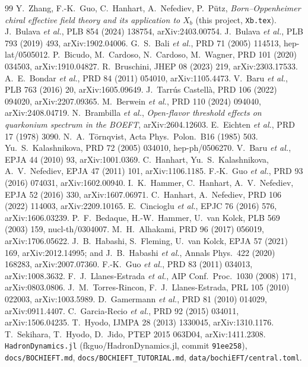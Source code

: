 \documentclass[11pt,a4paper]{article}
\begin{document}
\begin{thebibliography}{99}
\small
{} Y.~Zhang, F.-K.~Guo, C.~Hanhart, A.~Nefediev, P.~P\"utz, \emph{Born--Oppenheimer chiral effective field theory and its application to $X_b$} (this project, \texttt{Xb.tex}).
 J.~Bulava \emph{et al.}, PLB 854 (2024) 138754, arXiv:2403.00754.
 J.~Bulava \emph{et al.}, PLB 793 (2019) 493, arXiv:1902.04006.
 G.~S.~Bali \emph{et al.}, PRD 71 (2005) 114513, hep-lat/0505012.
 P.~Bicudo, M.~Cardoso, N.~Cardoso, M.~Wagner, PRD 101 (2020) 034503, arXiv:1910.04827.
 R.~Bruschini, JHEP 08 (2023) 219, arXiv:2303.17533.
 A.~E.~Bondar \emph{et al.}, PRD 84 (2011) 054010, arXiv:1105.4473.
 V.~Baru \emph{et al.}, PLB 763 (2016) 20, arXiv:1605.09649.
 J.~Tarr\'us Castell\`a, PRD 106 (2022) 094020, arXiv:2207.09365.
 M.~Berwein \emph{et al.}, PRD 110 (2024) 094040, arXiv:2408.04719.
 N.~Brambilla \emph{et al.}, \emph{Open-flavor threshold effects on quarkonium spectrum in the BOEFT}, arXiv:2604.12603.
 E.~Eichten \emph{et al.}, PRD 17 (1978) 3090.
 N.~A.~T\"ornqvist, Acta Phys.\ Polon.\ B16 (1985) 503.
 Yu.~S.~Kalashnikova, PRD 72 (2005) 034010, hep-ph/0506270.
 V.~Baru \emph{et al.}, EPJA 44 (2010) 93, arXiv:1001.0369.
 C.~Hanhart, Yu.~S.~Kalashnikova, A.~V.~Nefediev, EPJA 47 (2011) 101, arXiv:1106.1185.
 F.-K.~Guo \emph{et al.}, PRD 93 (2016) 074031, arXiv:1602.00940.
 I.~K.~Hammer, C.~Hanhart, A.~V.~Nefediev, EPJA 52 (2016) 330, arXiv:1607.06971.
 C.~Hanhart, A.~Nefediev, PRD 106 (2022) 114003, arXiv:2209.10165.
 E.~Cincioglu \emph{et al.}, EPJC 76 (2016) 576, arXiv:1606.03239.
 P.~F.~Bedaque, H.-W.~Hammer, U.~van Kolck, PLB 569 (2003) 159, nucl-th/0304007.
 M.~H.~Alhakami, PRD 96 (2017) 056019, arXiv:1706.05622.
 J.~B.~Habashi, S.~Fleming, U.~van Kolck, EPJA 57 (2021) 169, arXiv:2012.14995; and J.~B.~Habashi \emph{et al.}, Annals Phys.\ 422 (2020) 168283, arXiv:2007.07360.
 F.-K.~Guo \emph{et al.}, PRD 83 (2011) 034013, arXiv:1008.3632.
 F.~J.~Llanes-Estrada \emph{et al.}, AIP Conf.\ Proc.\ 1030 (2008) 171, arXiv:0803.0806.
 J.~M.~Torres-Rincon, F.~J.~Llanes-Estrada, PRL 105 (2010) 022003, arXiv:1003.5989.
 D.~Gamermann \emph{et al.}, PRD 81 (2010) 014029, arXiv:0911.4407.
 C.~Garcia-Recio \emph{et al.}, PRD 92 (2015) 034011, arXiv:1506.04235.
 T.~Hyodo, IJMPA 28 (2013) 1330045, arXiv:1310.1176.
 T.~Sekihara, T.~Hyodo, D.~Jido, PTEP 2015 063D04, arXiv:1411.2308.
 \texttt{HadronDynamics.jl} (fkguo/HadronDynamics.jl, commit \texttt{91ee258}), \texttt{docs/BOCHIEFT.md}, \texttt{docs/BOCHIEFT\_TUTORIAL.md}, \texttt{data/bochiEFT/central.toml}.
\end{thebibliography}
\end{document}
